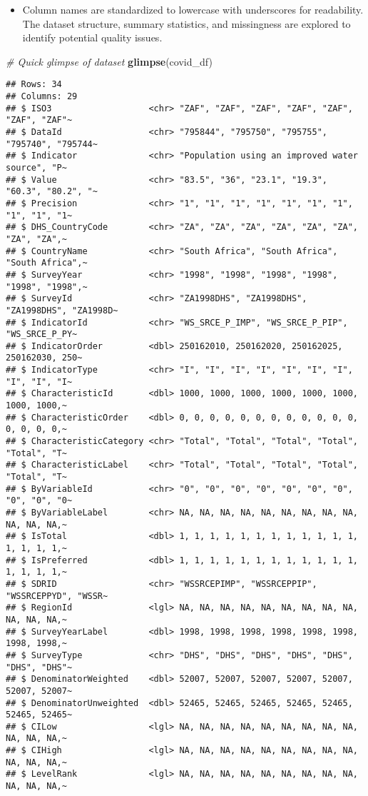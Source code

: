 \documentclass[
]{article}
\newenvironment{Shaded}{\begin{snugshade}}{\end{snugshade}}
\newcommand{\CommentTok}[1]{\textcolor[rgb]{0.56,0.35,0.01}{\textit{#1}}}
\newcommand{\FunctionTok}[1]{\textcolor[rgb]{0.13,0.29,0.53}{\textbf{#1}}}
\newcommand{\NormalTok}[1]{#1}
\providecommand{\tightlist}{%
  \setlength{\itemsep}{0pt}\setlength{\parskip}{0pt}}
\begin{document}
\begin{itemize}
\tightlist
\item
  Column names are standardized to lowercase with underscores for
  readability. The dataset structure, summary statistics, and
  missingness are explored to identify potential quality issues.
\end{itemize}

\begin{Shaded}
\begin{Highlighting}[]
\CommentTok{\# Quick glimpse of dataset}
\FunctionTok{glimpse}\NormalTok{(covid\_df)}
\end{Highlighting}
\end{Shaded}

\begin{verbatim}
## Rows: 34
## Columns: 29
## $ ISO3                   <chr> "ZAF", "ZAF", "ZAF", "ZAF", "ZAF", "ZAF", "ZAF"~
## $ DataId                 <chr> "795844", "795750", "795755", "795740", "795744~
## $ Indicator              <chr> "Population using an improved water source", "P~
## $ Value                  <chr> "83.5", "36", "23.1", "19.3", "60.3", "80.2", "~
## $ Precision              <chr> "1", "1", "1", "1", "1", "1", "1", "1", "1", "1~
## $ DHS_CountryCode        <chr> "ZA", "ZA", "ZA", "ZA", "ZA", "ZA", "ZA", "ZA",~
## $ CountryName            <chr> "South Africa", "South Africa", "South Africa",~
## $ SurveyYear             <chr> "1998", "1998", "1998", "1998", "1998", "1998",~
## $ SurveyId               <chr> "ZA1998DHS", "ZA1998DHS", "ZA1998DHS", "ZA1998D~
## $ IndicatorId            <chr> "WS_SRCE_P_IMP", "WS_SRCE_P_PIP", "WS_SRCE_P_PY~
## $ IndicatorOrder         <dbl> 250162010, 250162020, 250162025, 250162030, 250~
## $ IndicatorType          <chr> "I", "I", "I", "I", "I", "I", "I", "I", "I", "I~
## $ CharacteristicId       <dbl> 1000, 1000, 1000, 1000, 1000, 1000, 1000, 1000,~
## $ CharacteristicOrder    <dbl> 0, 0, 0, 0, 0, 0, 0, 0, 0, 0, 0, 0, 0, 0, 0, 0,~
## $ CharacteristicCategory <chr> "Total", "Total", "Total", "Total", "Total", "T~
## $ CharacteristicLabel    <chr> "Total", "Total", "Total", "Total", "Total", "T~
## $ ByVariableId           <chr> "0", "0", "0", "0", "0", "0", "0", "0", "0", "0~
## $ ByVariableLabel        <chr> NA, NA, NA, NA, NA, NA, NA, NA, NA, NA, NA, NA,~
## $ IsTotal                <dbl> 1, 1, 1, 1, 1, 1, 1, 1, 1, 1, 1, 1, 1, 1, 1, 1,~
## $ IsPreferred            <dbl> 1, 1, 1, 1, 1, 1, 1, 1, 1, 1, 1, 1, 1, 1, 1, 1,~
## $ SDRID                  <chr> "WSSRCEPIMP", "WSSRCEPPIP", "WSSRCEPPYD", "WSSR~
## $ RegionId               <lgl> NA, NA, NA, NA, NA, NA, NA, NA, NA, NA, NA, NA,~
## $ SurveyYearLabel        <dbl> 1998, 1998, 1998, 1998, 1998, 1998, 1998, 1998,~
## $ SurveyType             <chr> "DHS", "DHS", "DHS", "DHS", "DHS", "DHS", "DHS"~
## $ DenominatorWeighted    <dbl> 52007, 52007, 52007, 52007, 52007, 52007, 52007~
## $ DenominatorUnweighted  <dbl> 52465, 52465, 52465, 52465, 52465, 52465, 52465~
## $ CILow                  <lgl> NA, NA, NA, NA, NA, NA, NA, NA, NA, NA, NA, NA,~
## $ CIHigh                 <lgl> NA, NA, NA, NA, NA, NA, NA, NA, NA, NA, NA, NA,~
## $ LevelRank              <lgl> NA, NA, NA, NA, NA, NA, NA, NA, NA, NA, NA, NA,~
\end{verbatim}
\end{document}
